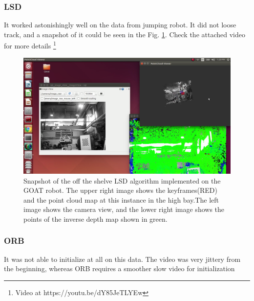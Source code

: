 \subsubsection{LSD}
It worked astonishingly well on the data from jumping robot. It did not loose track, and a snapshot of it could be seen in the Fig. \ref{fig:goatlsd}. Check the attached video for more details \footnote{Video at https://youtu.be/dY85JeTLYEw}
\begin{figure}[H]
	\centering
	\includegraphics[width=1.0\linewidth]{figures/GOAT_LSD}
	\caption{Snapshot of the off the shelve LSD algorithm implemented on the GOAT robot. The upper right image shows the keyframes(RED) and the point cloud map at this instance in the high bay.The left image shows the camera view, and the lower right image shows the points of the inverse depth map shown in green.}
	\label{fig:goatlsd}
\end{figure}

\subsubsection{ORB}
It was not able to initialize at all on this data. The video was very jittery from the beginning, whereas ORB requires a smoother slow video for initialization

